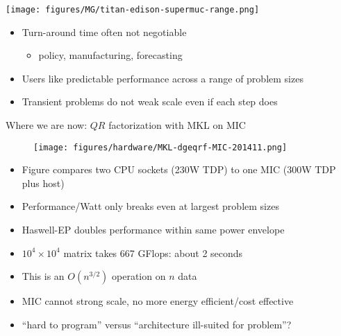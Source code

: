 \documentclass{beamer}
\begin{document}
\begin{frame}
  \vspace{-1em}
  \begin{center}
    \texttt{[image: figures/MG/titan-edison-supermuc-range.png]}
  \end{center}
  \vspace{-1em}
  \begin{itemize}
  \item Turn-around time often not negotiable
    \begin{itemize}
    \item policy, manufacturing, forecasting
    \end{itemize}
  \item Users like predictable performance across a range of problem sizes
  \item Transient problems do not weak scale even if each step does
  \end{itemize}
\end{frame}

\begin{frame}{Where we are now: $QR$ factorization with MKL on MIC}
  \begin{figure}
    \centering
    \texttt{[image: figures/hardware/MKL-dgeqrf-MIC-201411.png]}
  \end{figure}
  \begin{itemize}
  \item Figure compares two CPU sockets (230W TDP) to one MIC (300W TDP plus host)
  \item Performance/Watt only breaks even at largest problem sizes
  \item Haswell-EP doubles performance within same power envelope
  \item $10^4 \times 10^4$ matrix takes 667 GFlops: about 2 seconds
  \item This is an $O(n^{3/2})$ operation on $n$ data
  \item MIC cannot strong scale, no more energy efficient/cost effective
  \item ``hard to program'' versus ``architecture ill-suited for problem''?
  \end{itemize}
\end{frame}
\end{document}
